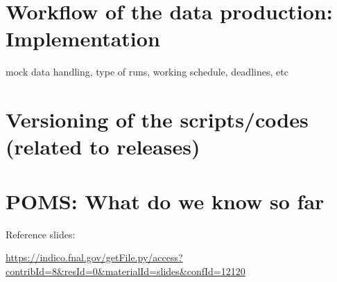 \documentclass[12pt,letterpaper]{article}
\begin{document}
\section{Workflow of the data production: Implementation }
mock data handling, type of runs, working schedule, deadlines, etc

\section{Versioning of the scripts/codes (related to releases)}

\section{POMS: What do we know so far}
Reference slides:

\url{https://indico.fnal.gov/getFile.py/access?contribId=8&resId=0&materialId=slides&confId=12120}
\end{document}
